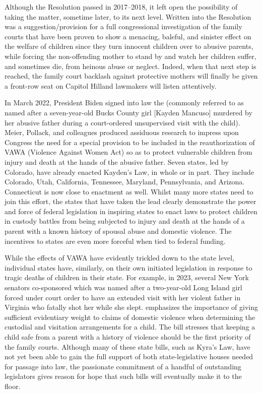 Although the Resolution passed in 2017--2018, it left open the possibility of taking the matter, sometime later, to its next level. Written
into the Resolution was a suggestion/provision for a full congressional
investigation of the family courts that have been proven to show a 
menacing, baleful, and sinister effect on 
the welfare of children since they turn innocent 
children over to abusive parents, while forcing 
the non-offending mother to stand by and watch her children suffer,
and sometimes die, from heinous abuse or neglect. Indeed, when that
next step is reached, the family court backlash against protective mothers will finally be given a front-row seat on Capitol Hill\mdash{}and lawmakers
will listen attentively. \pfl{}


In March 2022, President Biden signed into law the  (commonly referred to as  named after a seven-year-old Bucks County girl [Kayden
Mancuso] murdered by her abusive father during a court-ordered unsupervised visit with the child). Meier, Pollack, and colleagues produced
assiduous research to impress upon Congress the need for a special provision to be included in the reauthorization of VAWA (Violence Against
Women Act) so as to protect vulnerable children from injury and death
at the hands of the abusive father. Seven states, led by Colorado, have already enacted Kayden's Law, in whole or in part.
They include Colorado, Utah, California, Tennessee, Maryland, Pennsylvania, and Arizona. Connecticut is now close to enactment as well.
Whilst many more states need to join this effort, the states that have
taken the lead clearly demonstrate the power and force of federal legislation in inspiring states to enact laws to protect children in custody battles
from being subjected to injury and death at the hands of a parent with
a known history of spousal abuse and domestic violence.  The incentives to states are
even more forceful when tied to federal funding. \pfl{}

While the effects of VAWA have evidently trickled down to the state
level, individual states have, similarly, on their own initiated legislation in response to tragic deaths of children in their state. For example,
in 2023, several New York senators co-sponsored  which
was named after a two-year-old Long Island girl forced under court order to have an extended visit with her violent father in Virginia who
fatally shot her while she slept.  emphasizes the importance
of giving sufficient evidentiary weight to claims of domestic violence
when determining the custodial and visitation arrangements for a child.
The bill stresses that keeping a child safe from a parent with a history
of violence should be the first priority of the family courts. Although
many of these state bills, such as Kyra's Law, have not yet been able to
gain the full support of both state-legislative houses needed for passage into law, the passionate commitment of a handful of outstanding
legislators gives reason for hope that such bills will eventually make it to the
floor. \pfl{}

